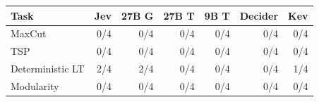 \begin{tabular}{lrrrrrr}
\toprule
Task & Jev & 27B G & 27B T & 9B T & Decider & Kev \\
\midrule
MaxCut & 0/4 & 0/4 & 0/4 & 0/4 & 0/4 & 0/4 \\
TSP & 0/4 & 0/4 & 0/4 & 0/4 & 0/4 & 0/4 \\
Deterministic LT & 2/4 & 2/4 & 0/4 & 0/4 & 0/4 & 1/4 \\
Modularity & 0/4 & 0/4 & 0/4 & 0/4 & 0/4 & 0/4 \\
\bottomrule
\end{tabular}
